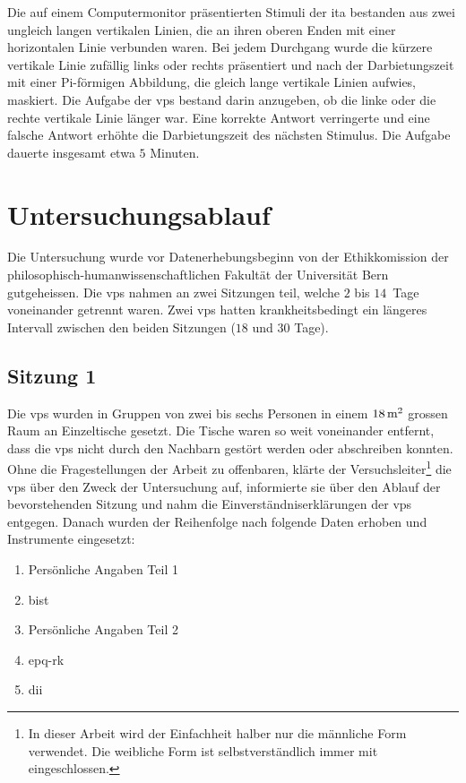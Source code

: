 \documentclass[11pt, twoside, a4paper]{book}		%
\begin{document}
Die auf einem Computermonitor präsentierten Stimuli der \gls{ita} \citep{Vickers1972} bestanden aus zwei ungleich langen vertikalen Linien, die an ihren oberen Enden mit einer horizontalen Linie verbunden waren. Bei jedem Durchgang wurde die kürzere vertikale Linie zufällig links oder rechts präsentiert und nach der Darbietungszeit mit einer Pi-förmigen Abbildung, die gleich lange vertikale Linien aufwies, maskiert. Die Aufgabe der \glspl{vp} bestand darin anzugeben, ob die linke oder die rechte vertikale Linie länger war. Eine korrekte Antwort verringerte und eine falsche Antwort erhöhte die Darbietungszeit des nächsten Stimulus. Die Aufgabe dauerte insgesamt etwa $5$ Minuten.


\section{Untersuchungsablauf \label{sec:Versuchsablauf}}

Die Untersuchung wurde vor Datenerhebungsbeginn von der Ethikkomission der philosophisch-humanwissenschaftlichen Fakultät der Universität Bern gutgeheissen. Die \glspl{vp} nahmen an zwei Sitzungen teil, welche $2$ bis $14$~Tage voneinander getrennt waren. Zwei \glspl{vp} hatten krankheitsbedingt ein längeres Intervall zwischen den beiden Sitzungen ($18$ und $30$ Tage).

\subsection{Sitzung 1}

Die \glspl{vp} wurden in Gruppen von zwei bis sechs Personen in einem $18\,\textnormal{m}^2$ grossen Raum an Einzeltische gesetzt. Die Tische waren so weit voneinander entfernt, dass die \glspl{vp} nicht durch den Nachbarn gestört werden oder abschreiben konnten. 
Ohne die Fragestellungen der Arbeit zu offenbaren, klärte der Versuchsleiter\footnote{In dieser Arbeit wird der Einfachheit halber nur die männliche Form verwendet. Die weibliche Form ist selbstverständlich immer mit eingeschlossen.} die \glspl{vp} über den Zweck der Untersuchung auf, informierte sie über den Ablauf der bevorstehenden Sitzung und nahm die Einverständniserklärungen der \glspl{vp} entgegen. Danach wurden der Reihenfolge nach folgende Daten erhoben und Instrumente eingesetzt:

\begin{enumerate}
	\item Persönliche Angaben Teil 1
	\item \acrshort{bist}
	\item Persönliche Angaben Teil 2
	\item \gls{epq-rk}
	\item \gls{dii}
\end{enumerate}
\end{document}
